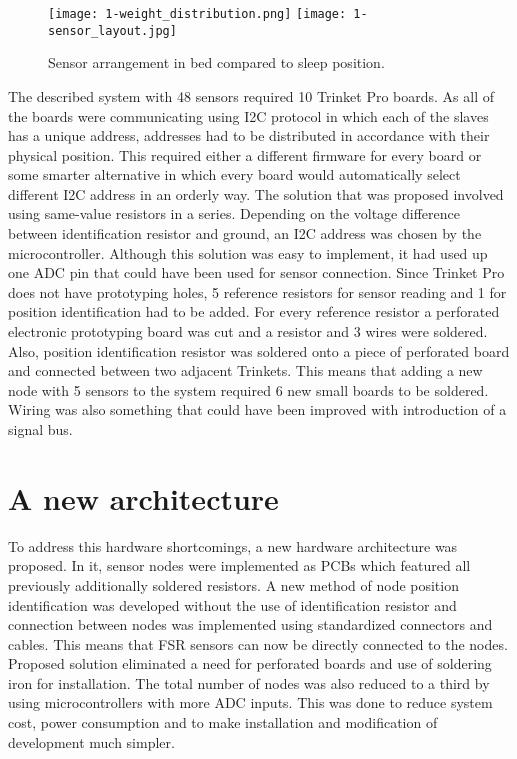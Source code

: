 \begin{figure}[h]
  \begin{center}
    \texttt{[image: 1-weight\_distribution.png]}
    \texttt{[image: 1-sensor\_layout.jpg]}
  \end{center}
  \caption{Sensor arrangement in bed compared to sleep position.}
  \label{fig:sensor-layout}
\end{figure}

The described system with 48 sensors required 10 Trinket Pro boards. As all of the boards were communicating using \ac{I2C} protocol in which each of the slaves has a unique address, addresses had to be distributed in accordance with their physical position. This required either a different firmware for every board or some smarter alternative in which every board would automatically select different I2C address in an orderly way. The solution that was proposed involved using same-value resistors in a series. Depending on the voltage difference between identification resistor and ground, an \ac{I2C} address was chosen by the microcontroller. Although this solution was easy to implement, it had used up one ADC pin that could have been used for sensor connection. Since Trinket Pro does not have prototyping holes, 5 reference resistors for sensor reading and 1 for position identification had to be added. For every reference resistor a perforated electronic prototyping board was cut and a resistor and 3 wires were soldered. Also, position identification resistor was soldered onto a piece of perforated board and connected between two adjacent Trinkets. This means that adding a new node with 5 sensors to the system required 6 new small boards to be soldered. Wiring was also something that could have been improved with introduction of a signal bus.


\section{A new architecture}

To address this hardware shortcomings, a new hardware architecture was proposed. In it, sensor nodes were implemented as \ac{PCB}s which featured all previously additionally soldered resistors. A new method of node position identification was developed without the use of identification resistor and connection between nodes was implemented using standardized connectors and cables. This means that \ac{FSR} sensors can now be directly connected to the nodes. Proposed solution eliminated a need for perforated boards and use of soldering iron for installation. The total number of nodes was also reduced to a third by using microcontrollers with more \ac{ADC} inputs. This was done to reduce system cost, power consumption and to make installation and modification of development much simpler.

